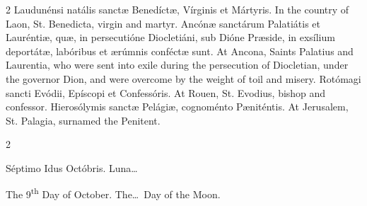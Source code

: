 \begin{paracol}{2}
 Laudunénsi natális sanctæ Benedíctæ, Vírginis et Mártyris.
\switchcolumn
{}
In the country of Laon, St. 
 Benedicta, virgin and martyr.
\switchcolumn*
{}
Ancónæ sanctárum 
 Palatiátis et Lauréntiæ, quæ, in persecutióne Diocletiáni, sub Dióne Præside, 
 in exsílium deportátæ, labóribus et ærúmnis conféctæ sunt.
\switchcolumn
{}
At Ancona, Saints Palatius and 
 Laurentia, who were sent into exile during the persecution of Diocletian, 
 under the governor Dion, and were overcome by the weight of toil and misery.
\switchcolumn*
{}
Rotómagi sancti Evódii, 
 Epíscopi et Confessóris.
\switchcolumn
{}
At Rouen, St. Evodius, bishop and 
 confessor.
\switchcolumn*
{}
Hierosólymis sanctæ 
 Pelágiæ, cognoménto Pæniténtis.
\switchcolumn
{}
At Jerusalem, St. Palagia, surnamed 
 the Penitent.
\switchcolumn*
{}
\end{paracol}


\begin{paracol}{2}
\begin{center}{\color{gregoriocolor} Séptimo Idus Octóbris. 
 Luna\dots\ }\end{center}
\switchcolumn
{}
\begin{center}{\color{gregoriocolor} The   9\textsuperscript{th} Day of 
 October. The\dots\ Day of the Moon.}\end{center}
\end{paracol}

